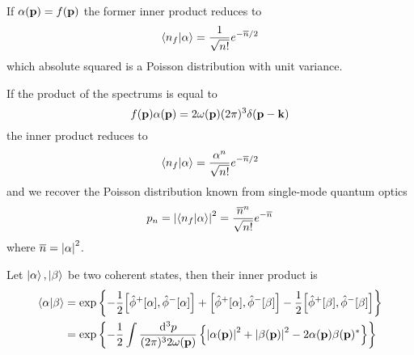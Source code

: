 \begin{corollary}
	If $\alpha(\vb{p})=f(\vb{p})$ the former inner product reduces to
	\begin{equation}
		\braket{n_f}{\alpha}
		=
		\frac{1}{\sqrt{n!}}
		e^{-\overline{n}/2}
	\end{equation}
	which absolute squared is a Poisson distribution with unit variance.
\end{corollary}
\begin{corollary}
	If the product of the spectrums is equal to
	\begin{equation}
		f(\vb{p})
		\alpha(\vb{p})
		=
		2\omega(\vb{p})
		(2\pi)^3
		\delta(\vb{p}-\vb{k})
	\end{equation}
	the inner product reduces to
	\begin{equation}
		\braket{n_f}{\alpha}
		=
		\frac{\alpha^n}{\sqrt{n!}}
		e^{-\overline{n}/2}
	\end{equation}
	and we recover the Poisson distribution known from single-mode quantum optics
	\begin{equation}
		p_n
		=
		\abs{\braket{n_f}{\alpha}}^2
		=
		\frac{\overline{n}^n}{\sqrt{n!}}
		e^{-\overline{n}}
	\end{equation}
	where $\overline{n}=\abs{\alpha}^2$.
\end{corollary}
\begin{lemma}\label{thm:coherent_state_inner_product}
	Let $\ket{\alpha},\ket{\beta}$ be two coherent states, then their inner product is
	\begin{equation}
		\begin{split}
			\braket{\alpha}{\beta}
			&=
			\exp\left\{
				-
				\frac{1}{2}
				\comm{\hat\phi^+[\alpha]}{\hat\phi^-[\alpha]}
				+
				\comm{\hat\phi^+[\alpha]}{\hat\phi^-[\beta]}
				-
				\frac{1}{2}
				\comm{\hat\phi^+[\beta]}{\hat\phi^-[\beta]}
			\right\}
			\\
			&=
			\exp\left\{
				-
				\frac{1}{2}
				\int\frac{\dd[3]{p}}{(2\pi)^32\omega(\vb{p})}
				\left\{
					\abs{\alpha(\vb{p})}^2
					+
					\abs{\beta(\vb{p})}^2
					-
					2\alpha(\vb{p})\beta(\vb{p})^*
				\right\}
			\right\}
		\end{split}
	\end{equation}
\end{lemma}
